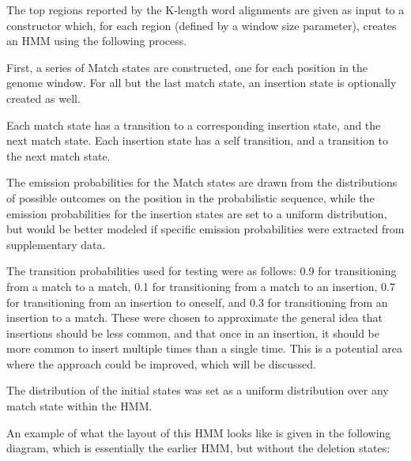 \documentclass[12pt, conference]{IEEEtran}
\begin{document}
	The top regions reported by the K-length word alignments are given as input to a constructor which, for each region (defined by a window size parameter), creates an HMM using the following process.
	
	First, a series of Match states are constructed, one for each position in the genome window. For all but the last match state, an insertion state is optionally created as well.
	
	Each match state has a transition to a corresponding insertion state, and the next match state. Each insertion state has a self transition, and a transition to the next match state.
	
	The emission probabilities for the Match states are drawn from the distributions of possible outcomes on the position in the probabilistic sequence, while the emission probabilities for the insertion states are set to a uniform distribution, but would be better modeled if specific emission probabilities were extracted from supplementary data.
	
	The transition probabilities used for testing were as follows: 0.9 for transitioning from a match to a match, 0.1 for transitioning from a match to an insertion, 0.7 for transitioning from an insertion to oneself, and 0.3 for transitioning from an insertion to a match. These were chosen to approximate the general idea that insertions should be less common, and that once in an insertion, it should be more common to insert multiple times than a single time. This is a potential area where the approach could be improved, which will be discussed.
	
	The distribution of the initial states was set as a uniform distribution over any match state within the HMM.
	
	An example of what the layout of this HMM looks like is given in the following diagram, which is essentially the earlier HMM, but without the deletion states:
	
\end{document}
